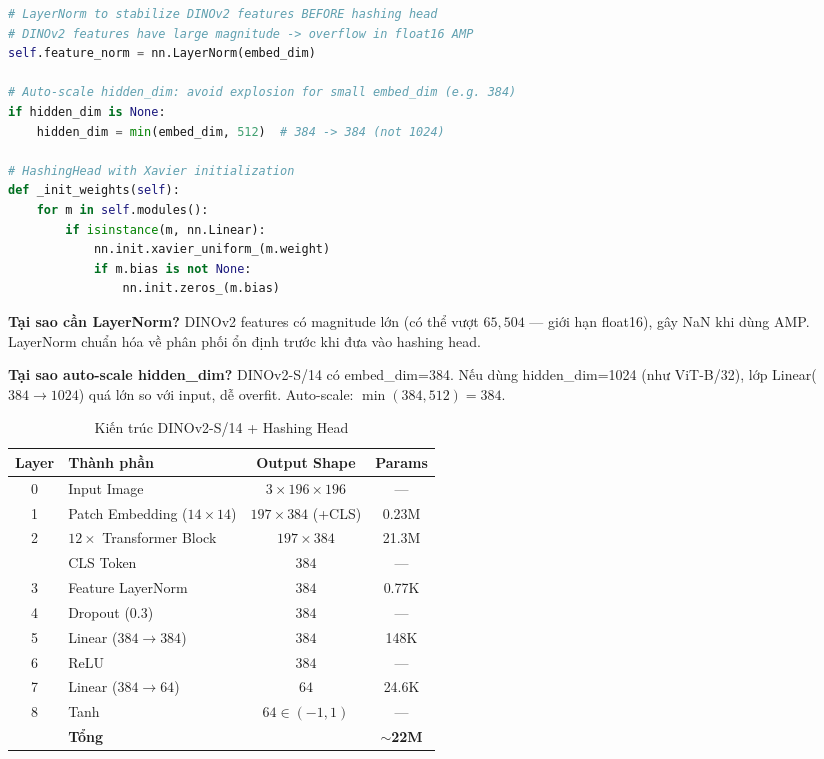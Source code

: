 \documentclass[13pt,a4paper]{article}
\begin{document}
\begin{lstlisting}[language=Python, caption={DINOv3Hashing: LayerNorm + Auto-scale}]
# LayerNorm to stabilize DINOv2 features BEFORE hashing head
# DINOv2 features have large magnitude -> overflow in float16 AMP
self.feature_norm = nn.LayerNorm(embed_dim)

# Auto-scale hidden_dim: avoid explosion for small embed_dim (e.g. 384)
if hidden_dim is None:
    hidden_dim = min(embed_dim, 512)  # 384 -> 384 (not 1024)

# HashingHead with Xavier initialization
def _init_weights(self):
    for m in self.modules():
        if isinstance(m, nn.Linear):
            nn.init.xavier_uniform_(m.weight)
            if m.bias is not None:
                nn.init.zeros_(m.bias)
\end{lstlisting}

\textbf{Tại sao cần LayerNorm?} DINOv2 features có magnitude lớn (có thể vượt $65{,}504$ --- giới hạn float16), gây NaN khi dùng AMP. LayerNorm chuẩn hóa về phân phối ổn định trước khi đưa vào hashing head.

\textbf{Tại sao auto-scale hidden\_dim?} DINOv2-S/14 có embed\_dim=384. Nếu dùng hidden\_dim=1024 (như ViT-B/32), lớp Linear($384\to1024$) quá lớn so với input, dễ overfit. Auto-scale: $\min(384, 512) = 384$.

\begin{table}[H]
\centering
\caption{Kiến trúc DINOv2-S/14 + Hashing Head}
\label{tab:dinov2_arch}
\begin{tabular}{clcc}
\toprule
\textbf{Layer} & \textbf{Thành phần} & \textbf{Output Shape} & \textbf{Params} \\
\midrule
0 & Input Image                & $3 \times 196 \times 196$  & --- \\
1 & Patch Embedding ($14\times14$) & $197 \times 384$ (+CLS) & 0.23M \\
2 & $12\times$ Transformer Block & $197 \times 384$          & 21.3M \\
\midrule
  & CLS Token                  & $384$                      & --- \\
3 & Feature LayerNorm          & $384$                      & 0.77K \\
\midrule
4 & Dropout (0.3)              & $384$                      & --- \\
5 & Linear ($384 \to 384$)     & $384$                      & 148K \\
6 & ReLU                       & $384$                      & --- \\
7 & Linear ($384 \to 64$)      & $64$                       & 24.6K \\
8 & Tanh                       & $64 \in (-1,1)$            & --- \\
\midrule
  & \textbf{Tổng}              &                            & \textbf{$\sim$22M} \\
\bottomrule
\end{tabular}
\end{table}
\end{document}
